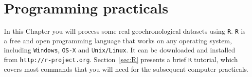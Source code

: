 \chapter{Programming practicals}
\label{ch:programming}

In this Chapter you will process some real geochronological datasets
using \texttt{R}. \texttt{R} is a free and open programming language
that works on any operating system, including \texttt{Windows},
\texttt{OS-X} and \texttt{Unix/Linux}. It can be downloaded and
installed from \texttt{http://r-project.org}. Section~\ref{sec:R}
presents a brief \texttt{R} tutorial, which covers most commands that
you will need for the subsequent computer practicals.
